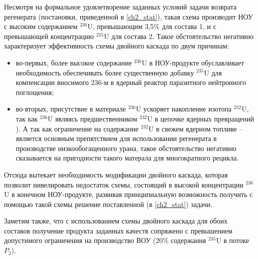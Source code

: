 Несмотря на формальное удовлетворение заданных условий задачи возврата регенерата (постановки, приведенной в \ref{ch2_stat}), такая схема производит НОУ с высоким содержанием $^{236}$U, превышающим 3,5\% для состава 1, и с превышающей концентрацию $^{235}$U для состава 2. Такое обстоятельство негативно характеризует эффективность схемы двойного каскада по двум причинам:

\begin{itemize}
  \item во-первых, более высокое содержание $^{236}$U в НОУ-продукте обуславливает необходимость обеспечивать более существенную добавку $^{235}$U для компенсации вносимого 236-м в ядерный реактор паразитного нейтронного поглощения;
  \item во-вторых, присутствие в материале $^{236}$U ускоряет накопление изотопа $^{232}$U, так как $^{236}$U являясь предшественником $^{232}$U в цепочке ядерных превращений \cite{smirnovEvolutionIsotopicComposition2012}). А так как ограничение на содержание $^{232}$U в свежем ядерном топливе -- является основным препятствием для использовании регенерата в производстве низкообогащенного урана, такое обстоятельство негативно сказывается на пригодности такого матерала для многократного рецикла.
\end{itemize}

Отсюда вытекает необходимость модификации двойного каскада, которая позволит нивелировать недостаток схемы, состоящий в высокой концентрации $^{236}$U в конечном НОУ-продукте, развивая принципиальную возможность получить с помощью такой схемы решение поставленной (в \ref{ch2_stat}) задачи. 

Заметим также, что с использованием схемы двойного каскада для обоих составов получение продукта заданных качеств сопряжено с превышением допустимого ограничения на производство ВОУ (20\% содержания $^{235}$U в потоке $P_{2}$).
















\clearpage
